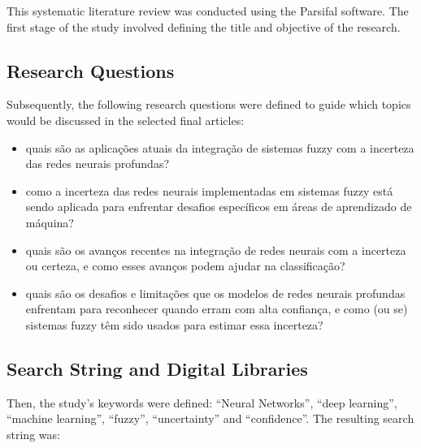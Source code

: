 
This systematic literature review was conducted using the Parsifal software. The first stage of the study involved defining the title and
objective of the research.

\subsection{Research Questions}

Subsequently, the following research questions were defined to guide which topics would be discussed in the selected final articles:

\begin{itemize}
\item[1)] quais são as aplicações atuais da integração de sistemas fuzzy com a incerteza das redes neurais profundas?
\item[2)] como a incerteza das redes neurais implementadas em sistemas fuzzy está sendo aplicada para enfrentar desafios específicos em
áreas de aprendizado de máquina?
\item[3)] quais são os avanços recentes na integração de redes neurais com a incerteza ou certeza, e como esses avanços podem ajudar na
classificação?
\item[4)] quais são os desafios e limitações que os modelos de redes neurais profundas enfrentam para reconhecer quando erram com alta
confiança, e como (ou se) sistemas fuzzy têm sido usados para estimar essa incerteza?
\end{itemize}

\subsection{Search String and Digital Libraries}

Then, the study's keywords were defined: ``Neural Networks'', ``deep learning'', ``machine learning'', ``fuzzy'', ``uncertainty'' and
``confidence''. The resulting search string was:

